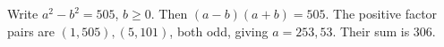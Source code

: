 Write $a^2-b^2=505$, $b\ge0$. Then $(a-b)(a+b)=505$. The positive factor pairs are $(1,505),(5,101)$, both odd, giving $a=253,53$. Their sum is $\boxed{306}$.
